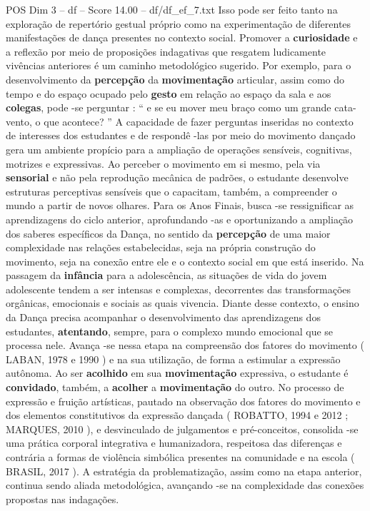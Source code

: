 \begin{textsample}{POS Dim 3 – df – Score 14.00 – df/df\_ef\_7.txt}
Isso pode ser feito tanto na exploração de repertório gestual próprio como na experimentação de diferentes manifestações de dança presentes no contexto social.
Promover a \textbf{curiosidade} e a reflexão por meio de proposições indagativas que resgatem ludicamente vivências anteriores é um caminho metodológico sugerido.
Por exemplo, para o desenvolvimento da \textbf{percepção} da \textbf{movimentação} articular, assim como do tempo e do espaço ocupado pelo \textbf{gesto} em relação ao espaço da sala e aos \textbf{colegas}, pode -se perguntar : “ e se eu mover meu braço como um grande cata-vento, o que acontece? ” A capacidade de fazer perguntas inseridas no contexto de interesses dos estudantes e de respondê -las por meio do movimento dançado gera um ambiente propício para a ampliação de operações sensíveis, cognitivas, motrizes e expressivas.
Ao perceber o movimento em si mesmo, pela via \textbf{sensorial} e não pela reprodução mecânica de padrões, o estudante desenvolve estruturas perceptivas sensíveis que o capacitam, também, a compreender o mundo a partir de novos olhares.
Para os Anos Finais, busca -se ressignificar as aprendizagens do ciclo anterior, aprofundando -as e oportunizando a ampliação dos saberes específicos da Dança, no sentido da \textbf{percepção} de uma maior complexidade nas relações estabelecidas, seja na própria construção do movimento, seja na conexão entre ele e o contexto social em que está inserido.
Na passagem da \textbf{infância} para a adolescência, as situações de vida do jovem adolescente tendem a ser intensas e complexas, decorrentes das transformações orgânicas, emocionais e sociais as quais vivencia.
Diante desse contexto, o ensino da Dança precisa acompanhar o desenvolvimento das aprendizagens dos estudantes, \textbf{atentando}, sempre, para o complexo mundo emocional que se processa nele.
Avança -se nessa etapa na compreensão dos fatores do movimento ( LABAN, 1978 e 1990 ) e na sua utilização, de forma a estimular a expressão autônoma.
Ao ser \textbf{acolhido} em sua \textbf{movimentação} expressiva, o estudante é \textbf{convidado}, também, a \textbf{acolher} a \textbf{movimentação} do outro.
No processo de expressão e fruição artísticas, pautado na observação dos fatores do movimento e dos elementos constitutivos da expressão dançada ( ROBATTO, 1994 e 2012 ; MARQUES, 2010 ), e desvinculado de julgamentos e pré-conceitos, consolida -se uma prática corporal integrativa e humanizadora, respeitosa das diferenças e contrária a formas de violência simbólica presentes na comunidade e na escola ( BRASIL, 2017 ).
A estratégia da problematização, assim como na etapa anterior, continua sendo aliada metodológica, avançando -se na complexidade das conexões propostas nas indagações.

\end{textsample}

